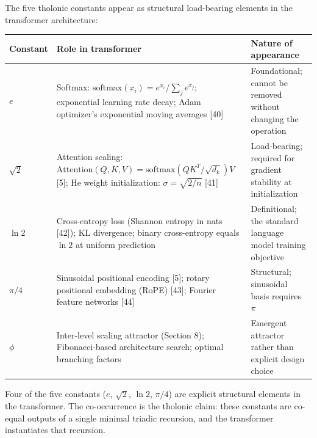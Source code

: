 \documentclass[
  11pt,
  letterpaper,
]{article}
\begin{document}
The five tholonic constants appear as structural load-bearing elements
in the transformer architecture:

\begin{longtable}[]{@{}
  >{\raggedright\arraybackslash}p{}
  >{\raggedright\arraybackslash}p{}
  >{\raggedright\arraybackslash}p{}@{}}
\toprule\noalign{}
\begin{minipage}[b]{\linewidth}\raggedright
Constant
\end{minipage} & \begin{minipage}[b]{\linewidth}\raggedright
Role in transformer
\end{minipage} & \begin{minipage}[b]{\linewidth}\raggedright
Nature of appearance
\end{minipage} \\
\midrule\noalign{}
\endhead
\bottomrule\noalign{}
\endlastfoot
\(e\) & Softmax: \(\text{softmax}(x_i) = e^{x_i}/\sum_j e^{x_j}\);
exponential learning rate decay; Adam optimizer's exponential moving
averages {[}40{]} & Foundational; cannot be removed without changing the
operation \\
\(\sqrt{2}\) & Attention scaling:
\(\text{Attention}(Q,K,V) = \text{softmax}(QK^T/\sqrt{d_k})V\) {[}5{]};
He weight initialization: \(\sigma = \sqrt{2/n}\) {[}41{]} &
Load-bearing; required for gradient stability at initialization \\
\(\ln 2\) & Cross-entropy loss (Shannon entropy in nats {[}42{]}); KL
divergence; binary cross-entropy equals \(\ln 2\) at uniform prediction
& Definitional; the standard language model training objective \\
\(\pi/4\) & Sinusoidal positional encoding {[}5{]}; rotary positional
embedding (RoPE) {[}43{]}; Fourier feature networks {[}44{]} &
Structural; sinusoidal basis requires \(\pi\) \\
\(\phi\) & Inter-level scaling attractor (Section 8); Fibonacci-based
architecture search; optimal branching factors & Emergent attractor
rather than explicit design choice \\
\end{longtable}

Four of the five constants (\(e\), \(\sqrt{2}\), \(\ln 2\), \(\pi/4\))
are explicit structural elements in the transformer. The co-occurrence
is the tholonic claim: these constants are co-equal outputs of a single
minimal triadic recursion, and the transformer instantiates that
recursion.
\end{document}
